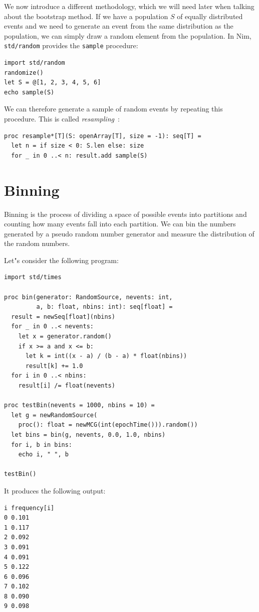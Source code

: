 \documentclass[justified, sixbynine]{tufte-book}
\def\ft{\small\tt}
\theoremstyle{plain}%
\newtheorem * {corollary}{Corollary}
\theoremstyle{definition}
\theoremstyle{remark}
\newtheorem * {remark}{Remark}
\newtheorem * {note}{Note}
\begin{document}
\begin{fullwidth}
We now introduce a different methodology, which we will need later when talking about the bootstrap method.
If we have a population $S$ of equally distributed events and we need to generate an event from the same distribution as the population, we can simply draw a random element from the population. In Nim, {\ft std/random} provides the {\ft sample} procedure:

\begin{lstlisting}
import std/random
randomize()
let S = @[1, 2, 3, 4, 5, 6]
echo sample(S)
\end{lstlisting}

We can therefore generate a sample of random events by repeating this procedure. This is called {\it resampling}~\cite{resampling}:

\begin{lstlisting}[caption={in file: {\ft nlib.nim}}]
proc resample*[T](S: openArray[T], size = -1): seq[T] =
  let n = if size < 0: S.len else: size
  for _ in 0 ..< n: result.add sample(S)
\end{lstlisting}

\goodbreak\section{Binning}

Binning is the process of dividing a space of possible events into
partitions and counting how many events fall into each partition. We can bin
the numbers generated by a pseudo random number generator and measure the
distribution of the random numbers.

Let"s consider the following program:
\begin{lstlisting}
import std/times

proc bin(generator: RandomSource, nevents: int,
         a, b: float, nbins: int): seq[float] =
  result = newSeq[float](nbins)
  for _ in 0 ..< nevents:
    let x = generator.random()
    if x >= a and x <= b:
      let k = int((x - a) / (b - a) * float(nbins))
      result[k] += 1.0
  for i in 0 ..< nbins:
    result[i] /= float(nevents)

proc testBin(nevents = 1000, nbins = 10) =
  let g = newRandomSource(
    proc(): float = newMCG(int(epochTime())).random())
  let bins = bin(g, nevents, 0.0, 1.0, nbins)
  for i, b in bins:
    echo i, " ", b

testBin()
\end{lstlisting}

It produces the following output:
\begin{lstlisting}
i frequency[i]
0 0.101
1 0.117
2 0.092
3 0.091
4 0.091
5 0.122
6 0.096
7 0.102
8 0.090
9 0.098
\end{lstlisting}


\end{fullwidth}
\end{document}
